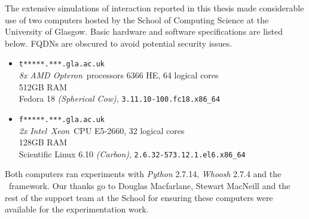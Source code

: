 
\begin{preamble}
{}

The extensive simulations of interaction reported in this thesis made considerable use of two computers hosted by the School of Computing Science at the University of Glasgow. Basic hardware and software specifications are listed below. FQDNs are obscured to avoid potential security issues.

\begin{itemize}
    
    \item{\texttt{t*****.***.gla.ac.uk}\\\emph{8x} \emph{AMD Opteron}\texttrademark~processors 6366 HE, 64 logical cores\\512GB RAM\\Fedora 18 \emph{(Spherical Cow)}, \texttt{3.11.10-100.fc18.x86\_64}}
    
    \item{\texttt{f*****.***.gla.ac.uk}\\\emph{2x} \emph{Intel}\textregistered~\emph{Xeon}\textregistered~CPU E5-2660, 32 logical cores\\128GB RAM\\Scientific Linux 6.10 \emph{(Carbon)}, \texttt{2.6.32-573.12.1.el6.x86\_64}}
    
\end{itemize}

Both computers ran experiments with \emph{Python} 2.7.14, \emph{Whoosh} 2.7.4 and the \simiir~framework. Our thanks go to Douglas Macfarlane, Stewart MacNeill and the rest of the support team at the School for ensuring these computers were available for the experimentation work.
\end{preamble}